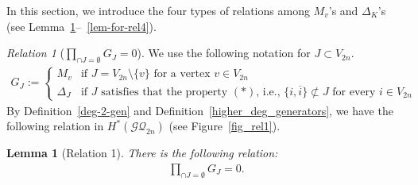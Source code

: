 \documentclass[12pt]{amsart}
\newtheorem{lemma}[theorem]{Lemma}
\theoremstyle{remark}
\newtheorem{relation}{Relation}
\numberwithin{equation}{section}
\begin{document}
In this section, we introduce the four types of relations among $M_{v}$'s and $\Delta_{K}$'s (see Lemma~\ref{lem-for-rel1}--~\ref{lem-for-rel4}).

\begin{relation}[$\prod_{\cap J=\emptyset}G_{J}=0$]
\label{relation1}
We use the following notation for $J\subset V_{2n}$.
\begin{align}
\label{def_G}
G_{J}:=\left\{
\begin{array}{ll}
M_{v} & \text{if $J=V_{2n}\setminus\{v\}$ for a vertex $v\in V_{2n}$} \\
\Delta_{J} & \text{if $J$ satisfies that the property $(\ast)$, i.e., $\{i,\overline{i}\}\not\subset J$ for every $i\in V_{2n}$}
\end{array}
\right.
\end{align}
By Definition~\ref{deg-2-gen} and Definition~\ref{higher_deg_generators},
we have the following relation in $H^{*}(\mathcal{GQ}_{2n})$ (see Figure~\ref{fig_rel1}).
\begin{lemma}[Relation 1]
\label{lem-for-rel1}
There is the following relation:
\begin{align}
\label{1st-rel}
\prod_{\cap J=\emptyset}G_{J}=0.
\end{align}
\end{lemma}
\end{relation}
\end{document}
